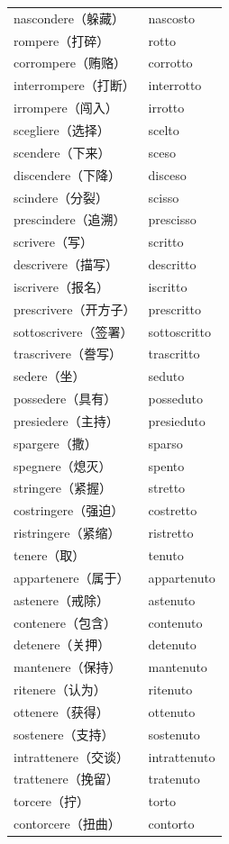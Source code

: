 \documentclass[UTF8,a4paper,titlepage,10pt]{report}
\begin{document}
\begin{enumerate}
\begin{itemize}
\begin{center}
\begin{tabular}{ll}
nascondere（躲藏） & nascosto\\
rompere（打碎） & rotto\\
corrompere（贿赂） & corrotto\\
interrompere（打断） & interrotto\\
irrompere（闯入） & irrotto\\
scegliere（选择） & scelto\\
scendere（下来） & sceso\\
discendere（下降） & disceso\\
scindere（分裂） & scisso\\
prescindere（追溯） & prescisso\\
scrivere（写） & scritto\\
descrivere（描写） & descritto\\
iscrivere（报名） & iscritto\\
prescrivere（开方子） & prescritto\\
sottoscrivere（签署） & sottoscritto\\
trascrivere（誊写） & trascritto\\
sedere（坐） & seduto\\
possedere（具有） & posseduto\\
presiedere（主持） & presieduto\\
spargere（撒） & sparso\\
spegnere（熄灭） & spento\\
stringere（紧握） & stretto\\
costringere（强迫） & costretto\\
ristringere（紧缩） & ristretto\\
tenere（取） & tenuto\\
appartenere（属于） & appartenuto\\
astenere（戒除） & astenuto\\
contenere（包含） & contenuto\\
detenere（关押） & detenuto\\
mantenere（保持） & mantenuto\\
ritenere（认为） & ritenuto\\
ottenere（获得） & ottenuto\\
sostenere（支持） & sostenuto\\
intrattenere（交谈） & intrattenuto\\
trattenere（挽留） & tratenuto\\
torcere（拧） & torto\\
contorcere（扭曲） & contorto\\

\end{tabular}
\end{center}
\end{itemize}
\end{enumerate}
\end{document}

